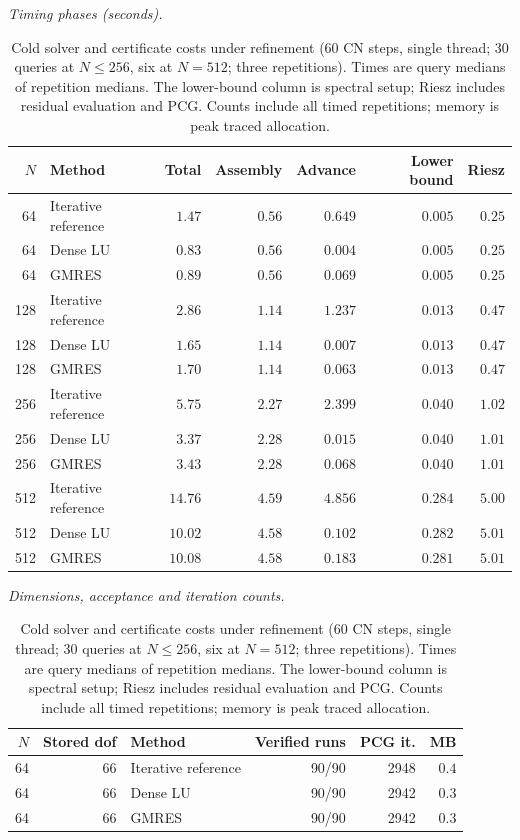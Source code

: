 \begin{table}[!htbp]
\centering\small
\caption{Cold solver and certificate costs under refinement (60 CN steps,
single thread; 30 queries at $N\le256$, six at $N=512$; three repetitions).
Times are query medians of repetition medians. The lower-bound column is
spectral setup; Riesz includes residual evaluation and PCG. Counts include
all timed repetitions; memory is peak traced allocation.}
\label{tab:scaling}
\textit{Timing phases (seconds).}\par\smallskip
\begin{tabular}{rlrrrrr}
\toprule
$N$ & Method & Total & Assembly & Advance & Lower bound & Riesz\\
\midrule
64 & Iterative reference & $1.47$ & $0.56$ & $0.649$ & $0.005$ & $0.25$\\
64 & Dense LU & $0.83$ & $0.56$ & $0.004$ & $0.005$ & $0.25$\\
64 & GMRES & $0.89$ & $0.56$ & $0.069$ & $0.005$ & $0.25$\\
128 & Iterative reference & $2.86$ & $1.14$ & $1.237$ & $0.013$ & $0.47$\\
128 & Dense LU & $1.65$ & $1.14$ & $0.007$ & $0.013$ & $0.47$\\
128 & GMRES & $1.70$ & $1.14$ & $0.063$ & $0.013$ & $0.47$\\
256 & Iterative reference & $5.75$ & $2.27$ & $2.399$ & $0.040$ & $1.02$\\
256 & Dense LU & $3.37$ & $2.28$ & $0.015$ & $0.040$ & $1.01$\\
256 & GMRES & $3.43$ & $2.28$ & $0.068$ & $0.040$ & $1.01$\\
512 & Iterative reference & $14.76$ & $4.59$ & $4.856$ & $0.284$ & $5.00$\\
512 & Dense LU & $10.02$ & $4.58$ & $0.102$ & $0.282$ & $5.01$\\
512 & GMRES & $10.08$ & $4.58$ & $0.183$ & $0.281$ & $5.01$\\
\bottomrule
\end{tabular}
\par\smallskip\textit{Dimensions, acceptance and iteration counts.}\par\smallskip
\begin{tabular}{rrlrrr}
\toprule
$N$ & Stored dof & Method & Verified runs & PCG it. & MB\\
\midrule
64 & 66 & Iterative reference & 90/90 & 2948 & $0.4$\\
64 & 66 & Dense LU & 90/90 & 2942 & $0.3$\\
64 & 66 & GMRES & 90/90 & 2942 & $0.3$\\

\end{tabular}
\end{table}
